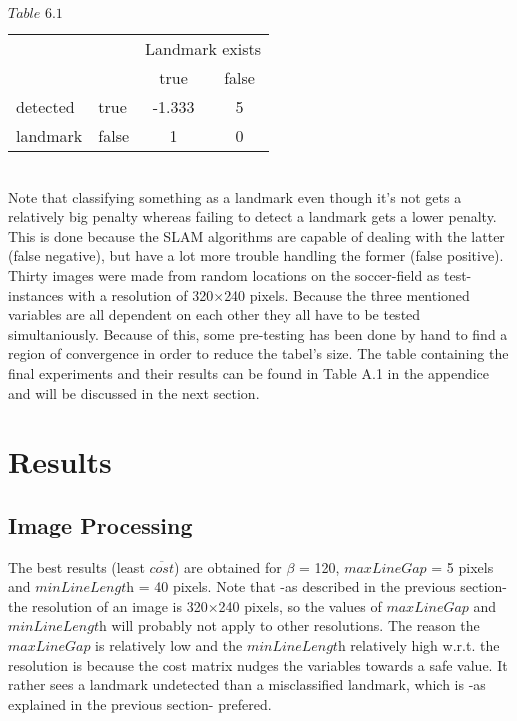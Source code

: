 \documentclass{ba-kecs}
\numberwithin{figure}{section}
\numberwithin{equation}{section}
\begin{document}
	$\textit{Table 6.1}$ \\
\begin{tabular}{ l l|c|c| }
\multicolumn{1}{r}{} & \multicolumn{1}{r}{} & \multicolumn{2}{c}{Landmark exists} \\
\multicolumn{1}{r}{} & \multicolumn{1}{r}{}
 &  \multicolumn{1}{c}{{\small true}}
 & \multicolumn{1}{c}{{\small false}} \\
\cline{3-4}
detected & {\small true} & -1.333 & 5 \\
\cline{3-4}
landmark & {\small false} & 1 & 0 \\
\cline{3-4}
\end{tabular} \\


Note that classifying something as a landmark even though it's not gets a relatively big penalty whereas failing to detect a landmark gets a lower penalty. This is done because the SLAM algorithms are capable of dealing with the latter (false negative), but have a lot more trouble handling the former (false positive). \\
Thirty images were made from random locations on the soccer-field as test-instances with a resolution of 320$\times$240 pixels.
Because the three mentioned variables are all dependent on each other they all have to be tested simultaniously. Because of this, some pre-testing has been done by hand to find a region of convergence in order to reduce the tabel's size. The table containing the final experiments and their results can be found in Table A.1 in the appendice and will be discussed in the next section.


\section{Results}

\subsection{Image Processing}
The best results (least $\overline{\textit{cost}}$) are obtained for $\beta$ = 120,  $\textit{maxLineGap}$ = 5 pixels and $\textit{minLineLength}$ = 40 pixels. Note that -as described in the previous section- the resolution of an image is 320$\times$240 pixels, so the values of $\textit{maxLineGap}$ and $\textit{minLineLength}$ will probably not apply to other resolutions.
The reason the $\textit{maxLineGap}$ is relatively low and the $\textit{minLineLength}$ relatively high w.r.t. the resolution is because the cost matrix nudges the variables towards a safe value. It rather sees a landmark undetected than a misclassified landmark, which is -as explained in the previous section- prefered.
\end{document}
